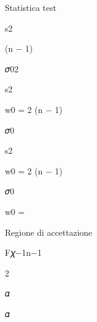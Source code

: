 \documentclass[a4paper,portrait,12pt]{article}
\begin{document}
\begin{flushleft}
Statistica test
\end{flushleft}


\begin{flushleft}
s2
\end{flushleft}


\begin{flushleft}
(n $-$ 1)
\end{flushleft}


\begin{flushleft}
𝜎02
\end{flushleft}


\begin{flushleft}
s2
\end{flushleft}


\begin{flushleft}
w0 = 2 (n $-$ 1)
\end{flushleft}


\begin{flushleft}
𝜎0
\end{flushleft}


\begin{flushleft}
s2
\end{flushleft}


\begin{flushleft}
w0 = 2 (n $-$ 1)
\end{flushleft}


\begin{flushleft}
𝜎0
\end{flushleft}


\begin{flushleft}
w0 =
\end{flushleft}





\begin{flushleft}
Regione di accettazione
\end{flushleft}


\begin{flushleft}
F𝜒$-$1n$-$1
\end{flushleft}


2





\begin{flushleft}
𝛼
\end{flushleft}


\begin{flushleft}
𝛼
\end{flushleft}
\end{document}
